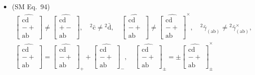 \documentclass[12pt]{article}
\begin{document}
\begin{itemize}[label={},leftmargin=0pt]
    \item (SM Eq.\ 94) 
    \[
    \begin{gathered}
    \widehat{\left[ \begin{smallmatrix} \mathrm{cd} \\ - + \\ \mathrm{ab} \end{smallmatrix} \right]} \ne \widehat{\left[ \begin{smallmatrix} \mathrm{cd} \\ + - \\ \mathrm{ab} \end{smallmatrix} \right]}, \quad {}^2\bar{\mathrm{c}} \ne {}^2\bar{\mathrm{d}}, \quad \widehat{\left[ \begin{smallmatrix} \mathrm{cd} \\ - + \\ \mathrm{ab} \end{smallmatrix} \right]} \ne \widehat{\left[ \begin{smallmatrix} \mathrm{cd} \\ - + \\ \mathrm{ab} \end{smallmatrix} \right]}^\times, \quad {}^2\bar{\gamma}_{(\mathrm{ab})} \ne {}^2\bar{\gamma}_{(\mathrm{ab})}^\times, \\
    \widehat{\left[ \begin{smallmatrix} \mathrm{cd} \\ - + \\ \mathrm{ab} \end{smallmatrix} \right]} = \widehat{\left[ \begin{smallmatrix} \mathrm{cd} \\ - + \\ \mathrm{ab} \end{smallmatrix} \right]}_+ + \widehat{\left[ \begin{smallmatrix} \mathrm{cd} \\ - + \\ \mathrm{ab} \end{smallmatrix} \right]}_-, \quad \widehat{\left[ \begin{smallmatrix} \mathrm{cd} \\ - + \\ \mathrm{ab} \end{smallmatrix} \right]}_\pm = \pm \widehat{\left[ \begin{smallmatrix} \mathrm{cd} \\ - + \\ \mathrm{ab} \end{smallmatrix} \right]}_\pm^\times
    \end{gathered}
    \]


\end{itemize}
\end{document}
